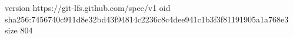 version https://git-lfs.github.com/spec/v1
oid sha256:7456740c911d8e32bd43f94814c2236c8c4dee941c1b3f3f81191905a1a768e3
size 804
